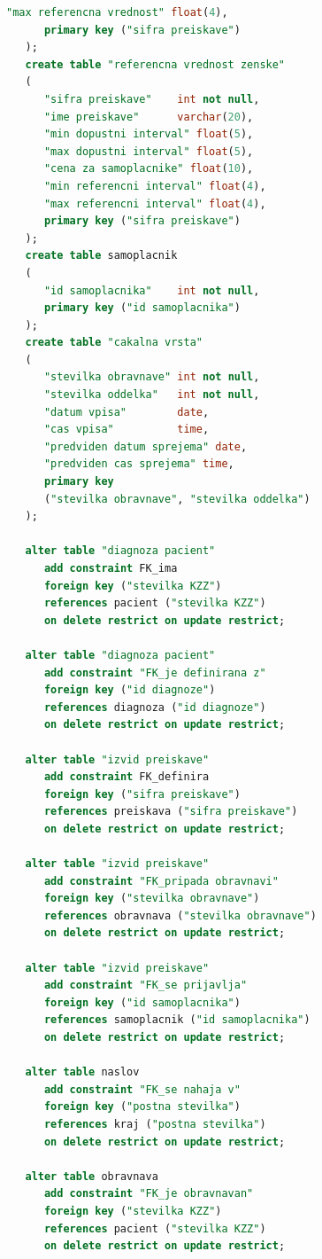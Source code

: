 \documentclass[a4paper,12pt]{report}
\begin{document}
\begin{lstlisting}[language=SQL]
      "max referencna vrednost" float(4),
      primary key ("sifra preiskave")
   );
   create table "referencna vrednost zenske"
   (
      "sifra preiskave"    int not null,
      "ime preiskave"      varchar(20),
      "min dopustni interval" float(5),
      "max dopustni interval" float(5),
      "cena za samoplacnike" float(10),
      "min referencni interval" float(4),
      "max referencni interval" float(4),
      primary key ("sifra preiskave")
   );
   create table samoplacnik
   (
      "id samoplacnika"    int not null,
      primary key ("id samoplacnika")
   );
   create table "cakalna vrsta"
   (
      "stevilka obravnave" int not null,
      "stevilka oddelka"   int not null,
      "datum vpisa"        date,
      "cas vpisa"          time,
      "predviden datum sprejema" date,
      "predviden cas sprejema" time,
      primary key 
      ("stevilka obravnave", "stevilka oddelka")
   );
   
   alter table "diagnoza pacient" 
      add constraint FK_ima 
      foreign key ("stevilka KZZ")
      references pacient ("stevilka KZZ") 
      on delete restrict on update restrict;
   
   alter table "diagnoza pacient" 
      add constraint "FK_je definirana z" 
      foreign key ("id diagnoze")
      references diagnoza ("id diagnoze") 
      on delete restrict on update restrict;
   
   alter table "izvid preiskave" 
      add constraint FK_definira 
      foreign key ("sifra preiskave")
      references preiskava ("sifra preiskave") 
      on delete restrict on update restrict;
   
   alter table "izvid preiskave" 
      add constraint "FK_pripada obravnavi" 
      foreign key ("stevilka obravnave")
      references obravnava ("stevilka obravnave") 
      on delete restrict on update restrict;
   
   alter table "izvid preiskave" 
      add constraint "FK_se prijavlja" 
      foreign key ("id samoplacnika")
      references samoplacnik ("id samoplacnika") 
      on delete restrict on update restrict;
   
   alter table naslov 
      add constraint "FK_se nahaja v" 
      foreign key ("postna stevilka")
      references kraj ("postna stevilka") 
      on delete restrict on update restrict;
   
   alter table obravnava 
      add constraint "FK_je obravnavan" 
      foreign key ("stevilka KZZ")
      references pacient ("stevilka KZZ") 
      on delete restrict on update restrict;
   

\end{lstlisting}
\end{document}
